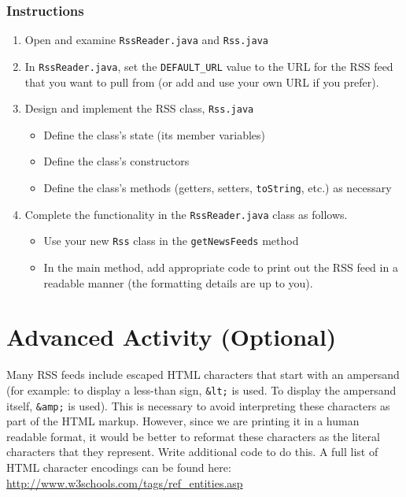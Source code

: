 \documentclass[12pt]{scrartcl}
\begin{document}
\subsubsection*{Instructions}

\begin{enumerate}
  \item Open and examine \texttt{RssReader.java} and \texttt{Rss.java} 
  \item In \texttt{RssReader.java}, set the \texttt{DEFAULT_URL} 
  	value to the URL for the RSS feed that you want to pull from 
	(or add and use your own URL if you prefer).
  \item Design and implement the RSS class, \texttt{Rss.java}
  \begin{itemize}
    \item Define the class's state (its member variables)
    \item Define the class's constructors
    \item Define the class's methods (getters, setters, \texttt{toString}, etc.) as necessary
  \end{itemize}
  \item Complete the functionality in the \texttt{RssReader.java} class as follows.
  \begin{itemize}
    \item Use your new \texttt{Rss} class in the \texttt{getNewsFeeds} method 
    \item In the main method, add appropriate code to print out the RSS feed in 
    	a readable manner (the formatting details are up to you).  
  \end{itemize}
\end{enumerate}

\section{Advanced Activity (Optional)}

Many RSS feeds include escaped HTML characters that start with an 
ampersand (for example: to display a less-than sign, \texttt{&lt;} 
is used.  To display the ampersand itself, \texttt{&amp;} is used).  
This is necessary to avoid interpreting these characters as part of the HTML 
markup.  However, since we are printing it in a human readable format, 
it would be better to reformat these characters as the literal characters 
that they represent.  Write additional code to do this.  A full list of HTML 
character encodings can be found here: \url{http://www.w3schools.com/tags/ref_entities.asp}
\end{document}
